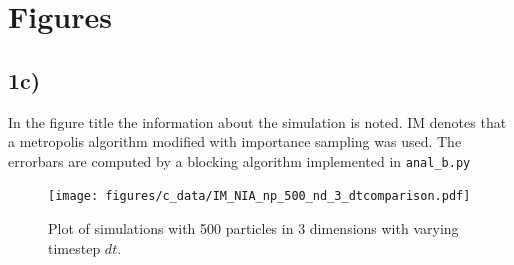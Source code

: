 \section{Figures}
\subsection{1c)}\label{app:fig-c}

In the figure title the information about the simulation is noted. IM denotes that a metropolis algorithm modified with importance sampling was used. 
The errorbars are computed by a blocking algorithm implemented in \lstinline{anal_b.py}

\begin{figure}
\hspace{-2.8cm}
\texttt{[image: figures/c\_data/IM\_NIA\_np\_500\_nd\_3\_dtcomparison.pdf]}
\caption{Plot of simulations with 500 particles in 3 dimensions with varying timestep $dt$.}
\label{fig:1c_dt}
\end{figure}

